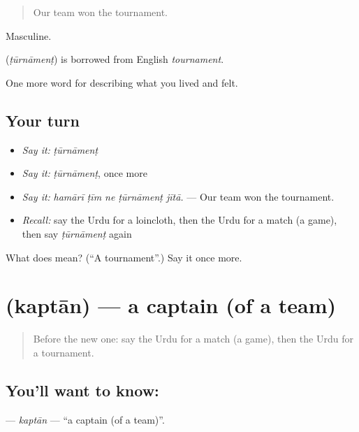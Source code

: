 \begin{quote}
Our team won the tournament.
\end{quote}

Masculine.

\begin{cousinweb}
\textbf{} (\emph{ṭūrnāmenṭ}) is borrowed from English \emph{tournament}.
\end{cousinweb}

\begin{grammarlens}[title={What you've built}]
One more word for describing what you lived and felt.
\end{grammarlens}

\subsection*{Your turn}
\begin{itemize}
\raggedright
  \item \emph{Say it:} \emph{ṭūrnāmenṭ}
  \item \emph{Say it:} \emph{ṭūrnāmenṭ}, once more
  \item \emph{Say it:} \emph{hamārī ṭīm ne ṭūrnāmenṭ jītā.} — Our team won the tournament.
  \item \emph{Recall:} say the Urdu for a loincloth, then the Urdu for a match (a game), then say \emph{ṭūrnāmenṭ} again
\end{itemize}

\begin{tcolorbox}[breakable,colback=teal!4,colframe=teal!35!black,title={Before you move on}]
What does  mean? (\textquotedblleft{}A tournament\textquotedblright{}.) Say it once more.
\end{tcolorbox}
\section[\texorpdfstring{\ur{کپتان} (kaptān)}{کپتان (kaptān)}]{ (kaptān) — a captain (of a team)}

\label{lesson:UR-C521-kaptan}



\begin{quote}
Before the new one: say the Urdu for a match (a game), then the Urdu for a tournament.
\end{quote}

\subsection*{You'll want to know: }
\textbf{} — \emph{kaptān} — \textquotedblleft{}a captain (of a team)\textquotedblright{}.

